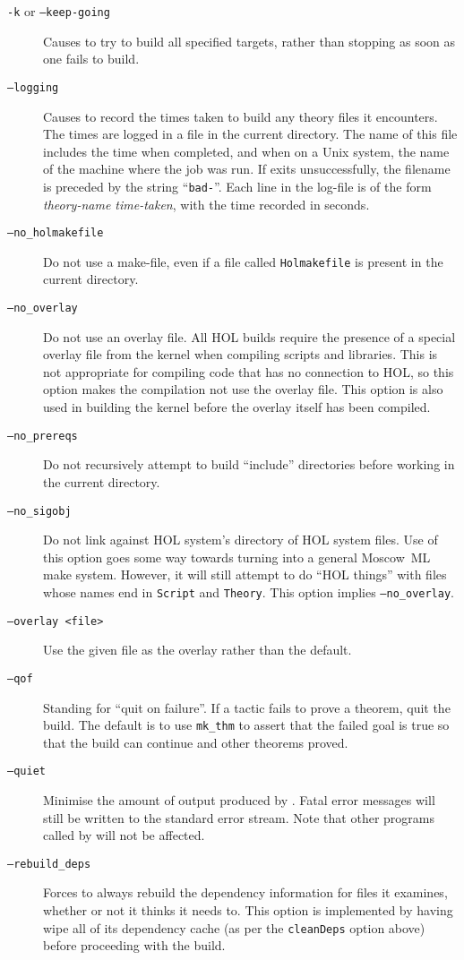 \begin{description}
\item[\texttt{-k} or \texttt{--keep-going}] Causes \holmake{} to try
  to build all specified targets, rather than stopping as soon as one
  fails to build.
\item[\texttt{--logging}] Causes \holmake{} to record the times taken
  to build any theory files it encounters.  The times are logged in a
  file in the current directory.  The name of this file includes the
  time when \holmake{} completed, and when on a Unix system, the name
  of the machine where the job was run.  If \holmake{} exits
  unsuccessfully, the filename is preceded by the string
  ``\texttt{bad-}''. Each line in the log-file is of the form
  \textit{theory-name time-taken}, with the time recorded in seconds.
\item[\texttt{--no\_holmakefile}]  Do not use a make-file, even if a file
  called \texttt{Holmakefile} is present in the current directory.
\item[\texttt{--no\_overlay}] Do not use an overlay file.  All HOL
  builds require the presence of a special overlay file from the
  kernel when compiling scripts and libraries.  This is not
  appropriate for compiling code that has no connection to HOL, so
  this option makes the compilation not use the overlay file.  This
  option is also used in building the kernel before the overlay itself
  has been compiled.
\item[\texttt{--no\_prereqs}]%
%
Do not recursively attempt to build ``include'' directories before working in the current directory.
\item[\texttt{--no\_sigobj}] Do not link against HOL system's
  directory of HOL system files.  Use of this option goes some way
  towards turning
  \holmake{} into a general Moscow~ML \textsf{make} system.  However,
  it will still attempt to do ``HOL things'' with files whose names
  end in \texttt{Script} and \texttt{Theory}.  This option implies
  \texttt{--no\_overlay}.
\item[\texttt{--overlay <file>}] Use the given file as the overlay
  rather than the default.
\item[\texttt{--qof}] Standing for ``quit on failure''.  If a tactic
  fails to prove a theorem, quit the build.  The default is to use
  \texttt{mk\_thm} to assert that the failed goal is true so that the
  build can continue and other theorems proved.
\item[\texttt{--quiet}] Minimise the amount of output produced by
  \holmake{}.  Fatal error messages will still be written to the
  standard error stream.  Note that other programs called by \holmake{} will not
  be affected.
\item[{\tt --rebuild\_deps}] Forces \holmake{} to always
  rebuild the dependency information for files it examines, whether or
  not it thinks it needs to.  This option is implemented by having
  \holmake{} wipe all of its dependency cache (as per the
  \texttt{cleanDeps} option above) before proceeding with the build.
\end{description}

